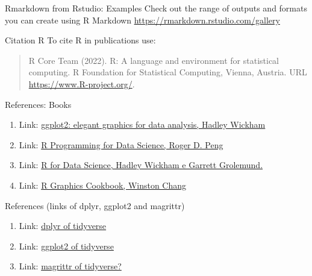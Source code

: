 \documentclass[
  ignorenonframetext,
]{beamer}
\begin{document}
\begin{frame}{Rmarkdown from Rstudio: Examples}
\protect\hypertarget{rmarkdown-from-rstudio-examples}{}
Check out the range of outputs and formats you can create using R
Markdown \url{https://rmarkdown.rstudio.com/gallery}
\end{frame}

\begin{frame}{Citation R}
\protect\hypertarget{citation-r}{}
To cite R in publications use:

\begin{quote}
R Core Team (2022). R: A language and environment for statistical
computing. R Foundation for Statistical Computing, Vienna, Austria. URL
\url{https://www.R-project.org/}.
\end{quote}
\end{frame}

\begin{frame}{References: Books}
\protect\hypertarget{references-books}{}
\begin{enumerate}[<+->]
[1)]
\item
  Link: \href{https://ggplot2-book.org/}{ggplot2: elegant graphics for
  data analysis, Hadley Wickham}
\item
  Link: \href{https://bookdown.org/rdpeng/rprogdatascience/}{R
  Programming for Data Science, Roger D. Peng}
\item
  Link: \href{https://r4ds.had.co.nz/}{R for Data Science, Hadley
  Wickham e Garrett Grolemund.}
\item
  Link: \href{https://r-graphics.org/}{R Graphics Cookbook, Winston
  Chang}
\end{enumerate}
\end{frame}

\begin{frame}{References (links of dplyr, ggplot2 and magrittr)}
\protect\hypertarget{references-links-of-dplyr-ggplot2-and-magrittr}{}
\begin{enumerate}[<+->]
[1)]
\item
  Link: \href{https://dplyr.tidyverse.org/}{dplyr of tidyverse}
\item
  Link: \href{https://ggplot2.tidyverse.org/}{ggplot2 of tidyverse}
\item
  Link: \href{https://magrittr.tidyverse.org/}{magrittr of tidyverse?}
\end{enumerate}
\end{frame}
\end{document}
